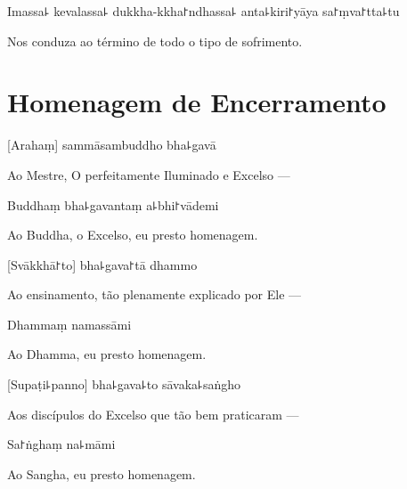 Imassa꜕ kevalassa꜕ dukkha-kkha꜓ndhassa꜕ anta꜕kiri꜓yāya sa꜓ṃva꜓tta꜕tu

\begin{english}
  Nos conduza ao término de todo o tipo de sofrimento.
\end{english}

\clearpage

\chapter{Homenagem de Encerramento}

[Arahaṃ] sammāsambuddho bha꜕gavā

\begin{english}
  Ao Mestre, O perfeitamente Iluminado e Excelso ---
\end{english}

Buddhaṃ bha꜕gavantaṃ a꜕bhi꜓vādemi

\begin{english}
  Ao Buddha, o Excelso, eu presto homenagem.
\end{english}

[Svākkhā꜓to] bha꜕gava꜓tā dhammo

\begin{english}
  Ao ensinamento, tão plenamente explicado por Ele ---
\end{english}

Dhammaṃ namassāmi

\begin{english}
  Ao Dhamma, eu presto homenagem.
\end{english}


[Supaṭi꜕panno] bha꜕gava꜕to sāvaka꜕saṅgho

\begin{english}
  Aos discípulos do Excelso que tão bem praticaram ---
\end{english}

Sa꜓ṅghaṃ na꜕māmi

\begin{english}
  Ao Sangha, eu presto homenagem.
\end{english}
